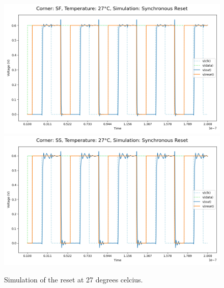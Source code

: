 \begin{figure}[H]
    \vspace{5pt}
    \includegraphics[height= 0.21\textheight]{figures/aimspice/0.600_0.1u_0.1u_0.3u_0.1u/functionality/SF27W3.png}
    \vspace{5pt}
    \includegraphics[height= 0.21\textheight]{figures/aimspice/0.600_0.1u_0.1u_0.3u_0.1u/functionality/SS27W3.png}
    \caption{Simulation of the reset at 27 degrees celcius.}
    \label{fig:aimspice_W3_27}
\end{figure}

\pagebreak

